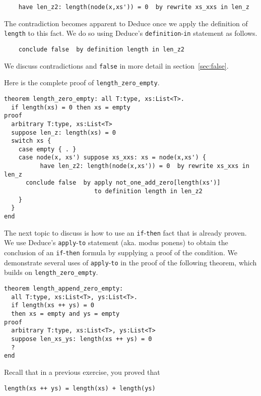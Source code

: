 \documentclass[12pt]{article}
\begin{document}
\begin{verbatim}
    have len_z2: length(node(x,xs')) = 0  by rewrite xs_xxs in len_z
\end{verbatim}

The contradiction becomes apparent to Deduce once we apply the
definition of \texttt{length} to this fact. We do so using Deduce's
\texttt{definition}-\texttt{in} statement as follows. 

\begin{verbatim}
    conclude false  by definition length in len_z2
\end{verbatim}

We discuss contradictions and \texttt{false} in more detail in
section~\ref{sec:false}.

Here is the complete proof of \texttt{length\_zero\_empty}.

\begin{verbatim}
theorem length_zero_empty: all T:type, xs:List<T>.
  if length(xs) = 0 then xs = empty
proof
  arbitrary T:type, xs:List<T>
  suppose len_z: length(xs) = 0
  switch xs {
    case empty { . }
    case node(x, xs') suppose xs_xxs: xs = node(x,xs') {
          have len_z2: length(node(x,xs')) = 0  by rewrite xs_xxs in len_z
      conclude false  by apply not_one_add_zero[length(xs')]
                         to definition length in len_z2
    }
  }
end
\end{verbatim}

The next topic to discuss is how to use an \texttt{if}-\texttt{then}
fact that is already proven.  We use Deduce's
\texttt{apply}-\texttt{to} statement (aka. modus ponens) to obtain the
conclusion of an \texttt{if}-\texttt{then} formula by supplying a
proof of the condition.  We demonstrate several uses of
\texttt{apply}-\texttt{to} in the proof of the following theorem,
which builds on \texttt{length\_zero\_empty}.

\begin{verbatim}
theorem length_append_zero_empty: 
  all T:type, xs:List<T>, ys:List<T>.
  if length(xs ++ ys) = 0
  then xs = empty and ys = empty
proof
  arbitrary T:type, xs:List<T>, ys:List<T>
  suppose len_xs_ys: length(xs ++ ys) = 0
  ?
end
\end{verbatim}

Recall that in a previous exercise, you proved that

\begin{verbatim}
length(xs ++ ys) = length(xs) + length(ys)
\end{verbatim}
\end{document}
